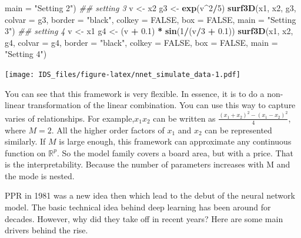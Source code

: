 \documentclass[12pt,]{krantz}
\makeatletter
\newenvironment{Shaded}{\begin{snugshade}}{\end{snugshade}}
\newcommand{\CommentTok}[1]{\textcolor[rgb]{0.37,0.37,0.37}{\textit{#1}}}
\newcommand{\DataTypeTok}[1]{\textcolor[rgb]{0.27,0.27,0.27}{#1}}
\newcommand{\DecValTok}[1]{\textcolor[rgb]{0.06,0.06,0.06}{#1}}
\newcommand{\FloatTok}[1]{\textcolor[rgb]{0.06,0.06,0.06}{#1}}
\newcommand{\KeywordTok}[1]{\textcolor[rgb]{0.27,0.27,0.27}{\textbf{#1}}}
\newcommand{\NormalTok}[1]{#1}
\newcommand{\OperatorTok}[1]{\textcolor[rgb]{0.43,0.43,0.43}{\textbf{#1}}}
\newcommand{\OtherTok}[1]{\textcolor[rgb]{0.37,0.37,0.37}{#1}}
\newcommand{\StringTok}[1]{\textcolor[rgb]{0.5,0.5,0.5}{#1}}
\newenvironment{kframe}{%
\medskip{}
\setlength{\fboxsep}{.8em}
 \def\at@end@of@kframe{}%
 \ifinner\ifhmode%
  \def\at@end@of@kframe{\end{minipage}}%
  \begin{minipage}{\columnwidth}%
 \fi\fi%
 \def\FrameCommand##1{\hskip\@totalleftmargin \hskip-\fboxsep
 \colorbox{shadecolor}{##1}\hskip-\fboxsep
     \hskip-\linewidth \hskip-\@totalleftmargin \hskip\columnwidth}%
 \MakeFramed {\advance\hsize-\width
   \@totalleftmargin\z@ \linewidth\hsize
   \@setminipage}}%
 {\par\unskip\endMakeFramed%
 \at@end@of@kframe}
\renewenvironment{Shaded}{\begin{kframe}}{\end{kframe}}
\makeatother
\begin{document}
\begin{Shaded}
\begin{Highlighting}[]
    \DataTypeTok{main =} \StringTok{"Setting 2"}\NormalTok{)}
\CommentTok{## setting 3}
\NormalTok{v <-}\StringTok{ }\NormalTok{x2}
\NormalTok{g3 <-}\StringTok{ }\KeywordTok{exp}\NormalTok{(v}\OperatorTok{^}\DecValTok{2}\OperatorTok{/}\DecValTok{5}\NormalTok{)}
\KeywordTok{surf3D}\NormalTok{(x1, x2, g3, }\DataTypeTok{colvar =}\NormalTok{ g3, }\DataTypeTok{border =} \StringTok{"black"}\NormalTok{, }\DataTypeTok{colkey =} \OtherTok{FALSE}\NormalTok{, }\DataTypeTok{box =} \OtherTok{FALSE}\NormalTok{, }
    \DataTypeTok{main =} \StringTok{"Setting 3"}\NormalTok{)}
\CommentTok{## setting 4}
\NormalTok{v <-}\StringTok{ }\NormalTok{x1}
\NormalTok{g4 <-}\StringTok{ }\NormalTok{(v }\OperatorTok{+}\StringTok{ }\FloatTok{0.1}\NormalTok{) }\OperatorTok{*}\StringTok{ }\KeywordTok{sin}\NormalTok{(}\DecValTok{1}\OperatorTok{/}\NormalTok{(v}\OperatorTok{/}\DecValTok{3} \OperatorTok{+}\StringTok{ }\FloatTok{0.1}\NormalTok{))}
\KeywordTok{surf3D}\NormalTok{(x1, x2, g4, }\DataTypeTok{colvar =}\NormalTok{ g4, }\DataTypeTok{border =} \StringTok{"black"}\NormalTok{, }\DataTypeTok{colkey =} \OtherTok{FALSE}\NormalTok{, }\DataTypeTok{box =} \OtherTok{FALSE}\NormalTok{, }
    \DataTypeTok{main =} \StringTok{"Setting 4"}\NormalTok{)}
\end{Highlighting}
\end{Shaded}

\texttt{[image: IDS\_files/figure-latex/nnet\_simulate\_data-1.pdf]}

You can see that this framework is very flexible. In essence, it is to do a non-linear transformation of the linear combination. You can use this way to capture varies of relationships. For example,\(x_{1}x_{2}\) can be written as \(\frac{(x_{1}+x_{2})^{2}-(x_{1}-x_{2})^{2}}{4}\), where \(M=2\). All the higher order factors of \(x_1\) and \(x_2\) can be represented similarly. If \(M\) is large enough, this framework can approximate any continuous function on \(\mathbb{R}^{p}\). So the model family covers a board area, but with a price. That is the interpretability. Because the number of parameters increases with M and the mode is nested.

PPR in 1981 was a new idea then which lead to the debut of the neural network model. The basic technical idea behind deep learning has been around for decades. However, why did they take off in recent years? Here are some main drivers behind the rise.
\end{document}
